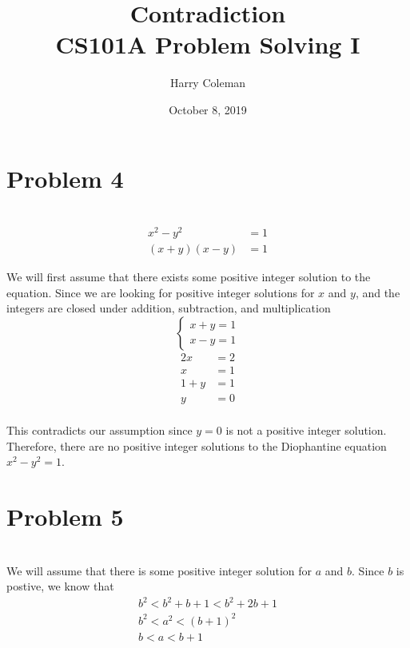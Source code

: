 \documentclass[12pt]{article}
\begin{document}
 
\title{Contradiction\\
    \large CS101A Problem Solving I}
\author{Harry Coleman}
\date{October 8, 2019}

\maketitle

\section*{Problem 4}
\\

\begin{align*}
    x^2 - y^2 &= 1 \\
    (x+y)(x-y) & = 1
\end{align*}

We will first assume that there exists some positive integer solution to the equation. Since we are looking for positive integer solutions for $x$ and $y$, and the integers are closed under addition, subtraction, and multiplication
\[\begin{cases}
    x+y = 1 \\
    x-y = 1
\end{cases}\]
\begin{align*}
    2x &= 2 \\
    x &= 1 \\
    1 + y &= 1 \\
    y & = 0 \\
\end{align*}

This contradicts our assumption since $y=0$ is not a positive integer solution. Therefore, there are no positive integer solutions to the Diophantine equation $x^2 - y^2 = 1$.


\newpage
\section*{Problem 5}
\\

We will assume that there is some positive integer solution for $a$ and $b$. Since $b$ is postive, we know that
\begin{gather*}
    b^2 < b^2 + b + 1 < b^2 + 2b + 1 \\
    b^2 < a^2 < (b+1)^2 \\
    b < a < b+1
\end{gather*}
\end{document}
